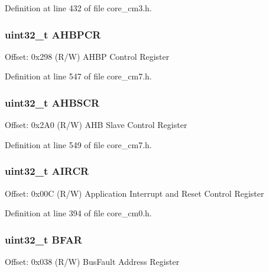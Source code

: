 Definition at line 432 of file core\+\_\+cm3.\+h.

\subsubsection[{\texorpdfstring{A\+H\+B\+P\+CR}{AHBPCR}}]{ uint32\+\_\+t A\+H\+B\+P\+CR}\hypertarget{struct_s_c_b___type_a209b4026c2994d0e18e883aa9af5c3cc}{}\label{struct_s_c_b___type_a209b4026c2994d0e18e883aa9af5c3cc}
Offset\+: 0x298 (R/W) A\+H\+BP Control Register 

Definition at line 547 of file core\+\_\+cm7.\+h.

\subsubsection[{\texorpdfstring{A\+H\+B\+S\+CR}{AHBSCR}}]{ uint32\+\_\+t A\+H\+B\+S\+CR}\hypertarget{struct_s_c_b___type_a25bb4ac449a4122217e2ca74b9ad4e3e}{}\label{struct_s_c_b___type_a25bb4ac449a4122217e2ca74b9ad4e3e}
Offset\+: 0x2\+A0 (R/W) A\+HB Slave Control Register 

Definition at line 549 of file core\+\_\+cm7.\+h.

\subsubsection[{\texorpdfstring{A\+I\+R\+CR}{AIRCR}}]{ uint32\+\_\+t A\+I\+R\+CR}\hypertarget{struct_s_c_b___type_a9b6ccd9c0c0865f8facad77ea37240b0}{}\label{struct_s_c_b___type_a9b6ccd9c0c0865f8facad77ea37240b0}
Offset\+: 0x00C (R/W) Application Interrupt and Reset Control Register 

Definition at line 394 of file core\+\_\+cm0.\+h.

\subsubsection[{\texorpdfstring{B\+F\+AR}{BFAR}}]{ uint32\+\_\+t B\+F\+AR}\hypertarget{struct_s_c_b___type_a3fde073744418e2fe476333cb4d55d0d}{}\label{struct_s_c_b___type_a3fde073744418e2fe476333cb4d55d0d}
Offset\+: 0x038 (R/W) Bus\+Fault Address Register 

